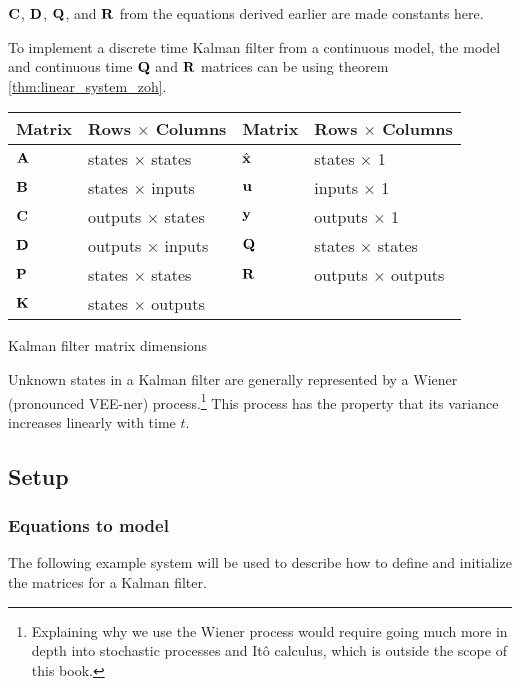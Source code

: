 $\mathbf{C}$, $\mathbf{D}$, $\mathbf{Q}$, and $\mathbf{R}$ from the equations derived
earlier are made constants here.
\begin{remark}
  To implement a discrete time Kalman filter from a continuous model, the model
  and continuous time $\mathbf{Q}$ and $\mathbf{R}$ matrices can be
   using theorem
  \ref{thm:linear_system_zoh}.
\end{remark}
\begin{booktable}
  \begin{tabular}{|ll|ll|}
    \hline
    \rowcolor{headingbg}
    \textbf{Matrix} & \textbf{Rows $\times$ Columns} &
    \textbf{Matrix} & \textbf{Rows $\times$ Columns} \\
    \hline
    $\mathbf{A}$ & states $\times$ states & $\hat{\mathbf{x}}$ & states $\times$ 1 \\
    $\mathbf{B}$ & states $\times$ inputs & $\mathbf{u}$ & inputs $\times$ 1 \\
    $\mathbf{C}$ & outputs $\times$ states & $\mathbf{y}$ & outputs $\times$ 1 \\
    $\mathbf{D}$ & outputs $\times$ inputs & $\mathbf{Q}$ & states $\times$ states \\
    $\mathbf{P}$ & states $\times$ states & $\mathbf{R}$ & outputs $\times$ outputs \\
    $\mathbf{K}$ & states $\times$ outputs & &
      \\
    \hline
  \end{tabular}
  \caption{Kalman filter matrix dimensions}
\end{booktable}

Unknown \glspl{state} in a Kalman filter are generally represented by a Wiener
(pronounced VEE-ner) process.\footnote{Explaining why we use the Wiener process
would require going much more in depth into stochastic processes and It\^{o}
calculus, which is outside the scope of this book.} This process has the
property that its variance increases linearly with time $t$.

\subsection{Setup}

\subsubsection{Equations to model}

The following example \gls{system} will be used to describe how to define and
initialize the matrices for a Kalman filter.

